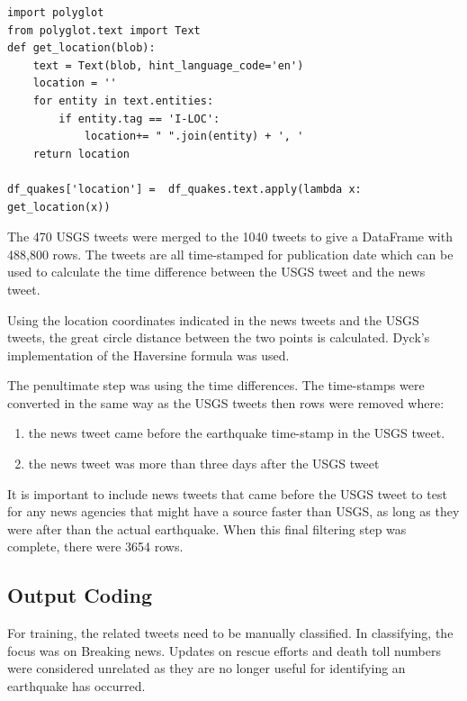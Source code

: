 \begin{lstlisting}[caption={Named Entity Extraction with polyglot}, captionpos=t, label={lst:ner}]
import polyglot
from polyglot.text import Text
def get_location(blob):
    text = Text(blob, hint_language_code='en')
    location = ''
    for entity in text.entities:
        if entity.tag == 'I-LOC':
            location+= " ".join(entity) + ', '
    return location

df_quakes['location'] =  df_quakes.text.apply(lambda x: get_location(x))

\end{lstlisting}

The 470 USGS tweets were merged to the 1040 tweets to give a DataFrame with 488,800 rows.  The tweets are all time-stamped for publication date which can be used to calculate the time difference between the USGS tweet and the news tweet.

Using the location coordinates indicated in the news tweets and the USGS tweets, the great circle distance between the two points is calculated. Dyck's implementation of the Haversine formula was used\cite{haversine}.

The penultimate step was using the time differences. The time-stamps were converted in the same way as the USGS tweets then rows were removed where:

\begin{enumerate}
    \item the news tweet came before the earthquake time-stamp in the USGS tweet.
    \item the news tweet was more than three days after the USGS tweet
\end{enumerate}

It is important to include news tweets that came before the USGS tweet to test for any news agencies that might have a source faster than USGS, as long as they were after than the actual earthquake. When this final filtering step was complete, there were 3654 rows.

\subsection{Output Coding}

For training, the related tweets need to be manually classified. In classifying, the focus was on Breaking news. Updates on rescue efforts and death toll numbers were considered unrelated as they are no longer useful for identifying an earthquake has occurred.

